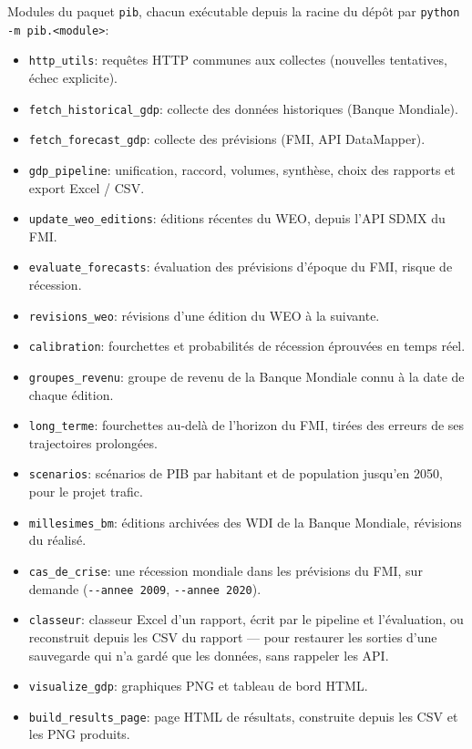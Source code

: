 \documentclass[11pt,a4paper]{article}
\begin{document}
\noindent Modules du paquet \texttt{pib}, chacun exécutable depuis la racine du dépôt par \texttt{python -m pib.<module>}:
\begin{itemize}
    \item \texttt{http\_utils}: requêtes HTTP communes aux collectes (nouvelles tentatives, échec explicite).
    \item \texttt{fetch\_historical\_gdp}: collecte des données historiques (Banque Mondiale).
    \item \texttt{fetch\_forecast\_gdp}: collecte des prévisions (FMI, API DataMapper).
    \item \texttt{gdp\_pipeline}: unification, raccord, volumes, synthèse, choix des rapports et export Excel / CSV.
    \item \texttt{update\_weo\_editions}: éditions récentes du WEO, depuis l'API SDMX du FMI.
    \item \texttt{evaluate\_forecasts}: évaluation des prévisions d'époque du FMI, risque de récession.
    \item \texttt{revisions\_weo}: révisions d'une édition du WEO à la suivante.
    \item \texttt{calibration}: fourchettes et probabilités de récession éprouvées en temps réel.
    \item \texttt{groupes\_revenu}: groupe de revenu de la Banque Mondiale connu à la date de chaque édition.
    \item \texttt{long\_terme}: fourchettes au-delà de l'horizon du FMI, tirées des erreurs de ses trajectoires prolongées.
    \item \texttt{scenarios}: scénarios de PIB par habitant et de population jusqu'en 2050, pour le projet trafic.
    \item \texttt{millesimes\_bm}: éditions archivées des WDI de la Banque Mondiale, révisions du réalisé.
    \item \texttt{cas\_de\_crise}: une récession mondiale dans les prévisions du FMI, sur demande (\texttt{-{}-annee 2009}, \texttt{-{}-annee 2020}).
    \item \texttt{classeur}: classeur Excel d'un rapport, écrit par le pipeline et l'évaluation, ou reconstruit depuis les CSV du rapport --- pour restaurer les sorties d'une sauvegarde qui n'a gardé que les données, sans rappeler les API.
    \item \texttt{visualize\_gdp}: graphiques PNG et tableau de bord HTML.
    \item \texttt{build\_results\_page}: page HTML de résultats, construite depuis les CSV et les PNG produits.
\end{itemize}
\end{document}

